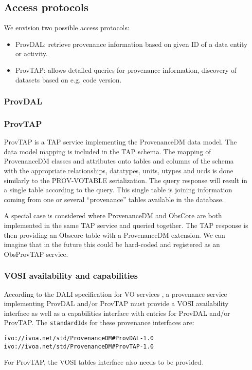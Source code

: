 \subsection{Access protocols}
\label{sec:access_protocols}
We envision two possible access protocols:
\begin{itemize}
\item ProvDAL: retrieve provenance information based on given ID of a data entity or activity.
\item ProvTAP: allows detailed queries for provenance information, discovery of datasets based on e.g. code version.
\end{itemize}

\subsubsection{ProvDAL}



\subsubsection{ProvTAP}
ProvTAP is a TAP service implementing the ProvenanceDM data model. The data model mapping is included in the TAP schema. The mapping of ProvenanceDM classes and attributes onto tables and columns of the schema with the appropriate relationships, datatypes, units, utypes and ucds is done similarly to the PROV-VOTABLE serialization. The query response will result in a single table according to the query.
This single table is joining information coming from one or several ``provenance'' tables available in the database.

A special case is considered where ProvenanceDM and ObsCore are both implemented in the same TAP service and queried together. The TAP response is then providing an Obscore table with a ProvenanceDM extension. We can imagine that in the future this could be hard-coded and registered as an ObsProvTAP service.






\subsubsection{VOSI availability and capabilities}
According to the DALI specification for VO services \citep{std:DALI}, a provenance service implementing ProvDAL and/or ProvTAP must provide a VOSI availability interface as well as a capabilities interface with entries for ProvDAL and/or ProvTAP. The \texttt{standardId}s for these provenance interfaces are:

\begin{verbatim}
ivo://ivoa.net/std/ProvenanceDM#ProvDAL-1.0
ivo://ivoa.net/std/ProvenanceDM#ProvTAP-1.0
\end{verbatim}

For ProvTAP, the VOSI tables interface also needs to be provided.

